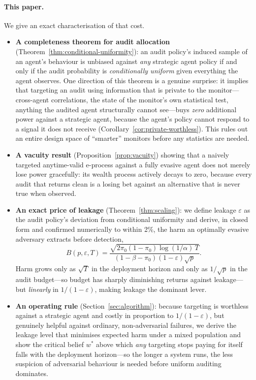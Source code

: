 \documentclass[sigconf,anonymous]{aamas}
\theoremstyle{plain}
\theoremstyle{definition}
\begin{document}
\paragraph{This paper.} We give an exact characterisation of that cost.

\begin{itemize}
\item \textbf{A completeness theorem for audit allocation}
(Theorem~\ref{thm:conditional-uniformity}): an audit policy's induced sample
of an agent's behaviour is unbiased against \emph{any} strategic agent
policy if and only if the audit probability is \emph{conditionally uniform}
given everything the agent observes. One direction of this theorem is a
genuine surprise: it implies that targeting an audit using information that
is private to the monitor---cross-agent correlations, the state of the
monitor's own statistical test, anything the audited agent structurally
cannot see---buys \emph{zero} additional power against a strategic agent,
because the agent's policy cannot respond to a signal it does not receive
(Corollary~\ref{cor:private-worthless}). This rules out an entire design
space of ``smarter'' monitors before any statistics are needed.

\item \textbf{A vacuity result} (Proposition~\ref{prop:vacuity}) showing
that a naively targeted anytime-valid e-process against a fully evasive
agent does not merely lose power gracefully: its wealth process actively
decays to zero, because every audit that returns clean is a losing bet
against an alternative that is never true when observed.

\item \textbf{An exact price of leakage} (Theorem~\ref{thm:scaling}): we
define leakage $\varepsilon$ as the audit policy's deviation from
conditional uniformity and derive, in closed form and confirmed numerically
to within 2\%, the harm an optimally evasive adversary extracts before
detection,
\[B(p,\varepsilon,T) = \frac{\sqrt{2\pi_0(1-\pi_0)\log(1/\alpha)\,T}}{(1-\beta-\pi_0)(1-\varepsilon)\sqrt{p}}.\]
Harm grows only as $\sqrt{T}$ in the deployment horizon and only as
$1/\sqrt{p}$ in the audit budget---so budget has sharply diminishing
returns against leakage---but \emph{linearly} in $1/(1-\varepsilon)$, making
leakage the dominant lever.

\item \textbf{An operating rule} (Section~\ref{sec:algorithm}): because
targeting is worthless against a strategic agent and costly in proportion to
$1/(1-\varepsilon)$, but genuinely helpful against ordinary, non-adversarial
failures, we derive the leakage level that minimises expected harm under a
mixed population and show the critical belief $w^*$ above which \emph{any}
targeting stops paying for itself falls with the deployment horizon---so
the longer a system runs, the less suspicion of adversarial behaviour is
needed before uniform auditing dominates.


\end{itemize}
\end{document}
